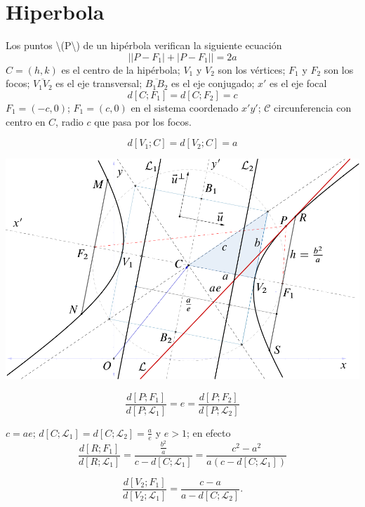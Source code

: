 \documentclass[12pt,]{report}
\let\origfigure=\figure
\let\endorigfigure=\endfigure
\renewenvironment{figure}[1][]{%
  \origfigure[H]
}{%
  \endorigfigure
}
\theoremstyle{slplain}
\begin{document}
\hypertarget{hiperbola}{%
\chapter{Hiperbola}\label{hiperbola}}

Los puntos \textbackslash{}(P\textbackslash{}) de un hipérbola verifican la siguiente ecuación
\[\left|\left|P-F_1\right|+\left|P-F_1\right|\right|=2a\]
\(C=(h,k)\) es el centro de la hipérbola; \(V_1\) y \(V_2\) son los vértices; \(F_1\) y \(F_2\) son los focos; \(\overline{V_1V_2}\) es el eje transversal; \(\overline{B_1B_2}\) es el eje conjugado; \(x'\) es el eje focal
\[d\left[C;F_1\right]=d\left[C;F_2\right]=c\]
\(F_1=(-c,0)\); \(F_1=(c,0)\) en el sistema coordenado \(x'y'\); \(\mathcal{C}\) circunferencia con centro en \(C\), radio \(c\) que pasa por los focos.

\[d\left[V_1;C\right]=d\left[V_2;C\right]=a\]

\begin{figure}

{\centering \includegraphics{hiperbola} 

}

\caption{Elipse vectorial}\label{fig:hiperbola}
\end{figure}

\[\frac{d\left[P;F_1\right]}{d\left[P;\mathcal{L}_1\right]}=e=\frac{d\left[P;F_2\right]}{d\left[P;\mathcal{L}_2\right]}\]

\(c=ae\); \(d\left[C;\mathcal{L}_1\right]=d\left[C;\mathcal{L}_2\right]=\frac{a}{e}\) y \(e>1\); en efecto \[\frac{d\left[R;F_1\right]}{d\left[R;\mathcal{L}_1\right]}=\frac{\frac{b^2}{a}}{c-d\left[C;\mathcal{L}_1\right]}=\frac{c^2-a^2}{a(c-d\left[C;\mathcal{L}_1\right])}\]

\[\frac{d\left[V_2;F_1\right]}{d\left[V_2;\mathcal{L}_1\right]}=\frac{c-a}{a-d\left[C;\mathcal{L}_2\right]}.\]
\end{document}
